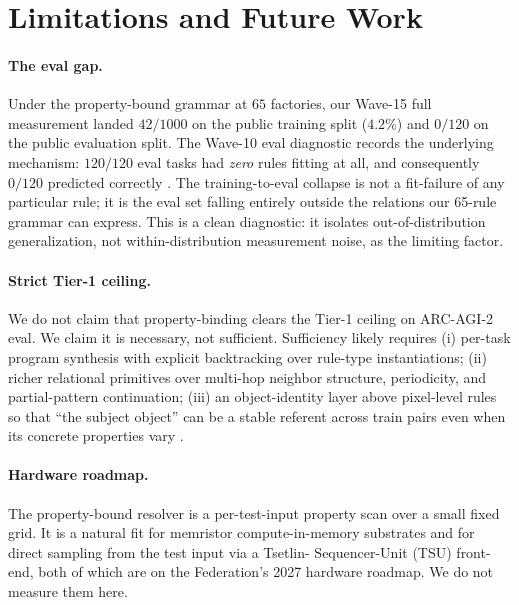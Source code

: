\documentclass[11pt]{article}
\begin{document}
\section{Limitations and Future Work}

\paragraph{The eval gap.}
Under the property-bound grammar at $65$ factories, our Wave-15 full
measurement landed $42/1000$ on the public training split ($4.2\%$) and
$0/120$ on the public evaluation split. The Wave-10 eval diagnostic
records the underlying mechanism: $120/120$ eval tasks had
\emph{zero} rules fitting at all, and consequently
$0/120$ predicted correctly \cite{wave10eval}. The training-to-eval
collapse is not a fit-failure of any particular rule; it is the eval set
falling entirely outside the relations our 65-rule grammar can express.
This is a clean diagnostic: it isolates out-of-distribution
generalization, not within-distribution measurement noise, as the
limiting factor.

\paragraph{Strict Tier-1 ceiling.}
We do not claim that property-binding clears the Tier-1 ceiling on
ARC-AGI-2 eval. We claim it is necessary, not sufficient. Sufficiency
likely requires (i) per-task program synthesis with explicit backtracking
over rule-type instantiations; (ii) richer relational primitives over
multi-hop neighbor structure, periodicity, and partial-pattern
continuation; (iii) an object-identity layer above pixel-level rules so
that ``the subject object'' can be a stable referent across train pairs
even when its concrete properties vary \cite{innovations}.

\paragraph{Hardware roadmap.}
The property-bound resolver is a per-test-input property scan over a
small fixed grid. It is a natural fit for memristor compute-in-memory
substrates and for direct sampling from the test input via a Tsetlin-
Sequencer-Unit (TSU) front-end, both of which are on the Federation's
2027 hardware roadmap. We do not measure them here.

\end{document}
